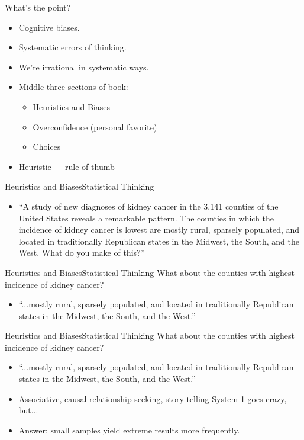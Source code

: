 \documentclass{beamer}
\begin{document}
\begin{frame}{What's the point?}{}
\begin{itemize}
\addtolength{\itemsep}{0.5\baselineskip}
\item Cognitive biases.
\item Systematic errors of thinking.
\item We're irrational in systematic ways.
\item Middle three sections of book:
    \begin{itemize}
    \addtolength{\itemsep}{0.5\baselineskip}
    \item Heuristics and Biases
    \item Overconfidence (personal favorite)
    \item Choices
    \end{itemize}
\item Heuristic --- rule of thumb
\end{itemize}
\end{frame}

\begin{frame}{Heuristics and Biases}{Statistical Thinking}
\begin{itemize}
\item ``A study of new diagnoses of kidney cancer in the 3,141 counties of the United States reveals a remarkable pattern. The counties in which the incidence of kidney cancer is lowest are mostly rural, sparsely populated, and located in traditionally Republican states in the Midwest, the South, and the West. What do you make of this?''
\end{itemize}
\end{frame}


\begin{frame}{Heuristics and Biases}{Statistical Thinking}
What about the counties with highest incidence of kidney cancer?
\begin{itemize}
\item ``...mostly rural, sparsely populated, and located in traditionally Republican states in the Midwest, the South, and the West.''
\end{itemize}
\end{frame}

\begin{frame}{Heuristics and Biases}{Statistical Thinking}
What about the counties with highest incidence of kidney cancer?
\begin{itemize}
\item ``...mostly rural, sparsely populated, and located in traditionally Republican states in the Midwest, the South, and the West.''
\item Associative, causal-relationship-seeking, story-telling System 1 goes crazy, but...
\item Answer: small samples yield extreme results more frequently.
\end{itemize}
\end{frame}
\end{document}

